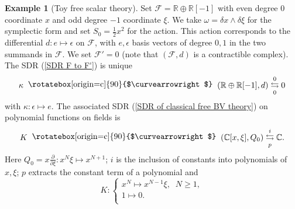 \documentclass{amsart}
\theoremstyle{plain} %
\theoremstyle{definition}
\newtheorem{expl}[thm]{Example}
\theoremstyle{remark}
\newcommand{\F}{\mathcal{F}}
\newcommand{\RR}{\mathbb{R}}
\newcommand{\CC}{\mathbb{C}}
\newcommand{\SDR}[5]{#5\;\;\raisebox{1.3pt}{\rotatebox[origin=c]{90}{$\curvearrowright$}}\;\; #1 \underset{#4}{\stackrel{#3}{\leftrightarrows}} #2}  %
\begin{document}
\begin{expl}[Toy free scalar theory]\label{example: toy scalar S_0=x^2/2}
    Set $\F=\RR\oplus \RR[-1]$ with even degree $0$ coordinate $x$ and odd degree $-1$ coordinate $\xi$. We take $\omega=\delta x\wedge \delta\xi$ for the symplectic form and set $S_0=\frac12 x^2$ for the action. This action corresponds to the differential $d\colon e\mapsto \epsilon$ on $\F$, with $e,\epsilon$ basis vectors of degree $0,1$ in the two summands in $\F$. We set $\F'=0$ (note that $(\F,d)$ is a contractible complex). The SDR (\ref{SDR F to F'}) is unique
    \begin{equation}
        \SDR{(\RR\oplus \RR[-1],d)}{0}{0}{0}{\kappa}
    \end{equation}
    with $\kappa\colon \epsilon \mapsto e$. The associated SDR (\ref{SDR of classical free BV theory}) on polynomial functions on fields is
    \begin{equation}\label{toy free scalar with S_0=x^2/2: classical SDR for fun(fields)}
        \SDR{(\CC[x,\xi],Q_0)}{\CC}{i}{p}{K}.
    \end{equation}
    Here $Q_0=x\frac{\partial}{\partial \xi}\colon  x^{N}\xi \mapsto x^{N+1}$; $i$ is the inclusion of constants into polynomials of $x,\xi$; $p$ extracts the constant term of a polynomial and
    \begin{equation}
    K\colon 
    \begin{cases}
        x^N \mapsto x^{N-1}\xi,\;\; N\geq 1,\\
        1\mapsto 0.\\
    \end{cases}
    \end{equation}
\end{expl}
\end{document}
